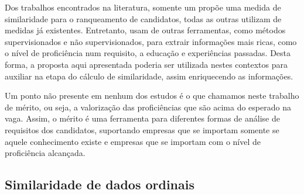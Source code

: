 \documentclass[preprint,12pt]{elsarticle}
\begin{document}
Dos trabalhos encontrados na literatura, somente um \cite{impact-semantic-web-2005} propõe uma medida de similaridade para o ranqueamento de candidatos, todas as outras utilizam de medidas já existentes. Entretanto, usam de outras ferramentas, como métodos supervisionados e não supervisionados, para extrair informações mais ricas, como o nível de proficiência num requisito, a educação e experiências passadas. Desta forma, a proposta aqui apresentada poderia ser utilizada nestes contextos para auxiliar na etapa do cálculo de similaridade, assim enriquecendo as informações.


Um ponto não presente em nenhum dos estudos é o que chamamos neste trabalho de mérito, ou seja, a valorização das proficiências que são acima do esperado na vaga. Assim, o mérito é uma ferramenta para diferentes formas de análise de requisitos dos candidatos, suportando empresas que se importam somente se aquele conhecimento existe e empresas que se importam com o nível de proficiência alcançada.






\subsection{Similaridade de dados ordinais}
\label{ssec:sim-ordinal-data}
\end{document}
